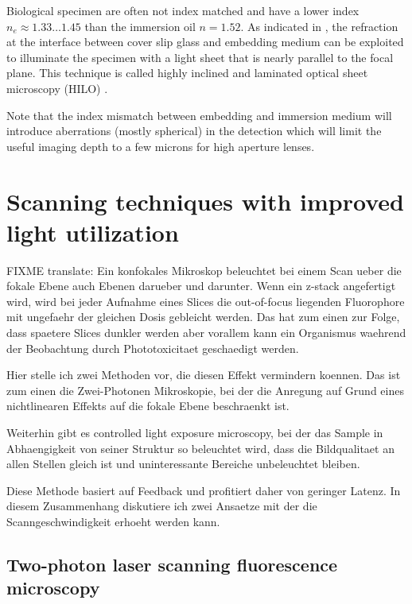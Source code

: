 
Biological specimen are often not index matched and have a lower index
$n_e\approx 1.33\ldots1.45$ than the immersion oil $n=1.52$. As
indicated in , the refraction at the interface
between cover slip glass and embedding medium can be exploited to
illuminate the specimen with a light sheet that is nearly parallel to
the focal plane.  This technique is called highly inclined and
laminated optical sheet microscopy (HILO) \citep{Tokunaga2008,
  Konopka2008}.


Note that the index mismatch between embedding and immersion medium
will introduce aberrations (mostly spherical) in the detection which
will limit the useful imaging depth to a few microns for high aperture
lenses.
\section{Scanning techniques with improved light utilization}
\begin{summary}
  FIXME translate: Ein konfokales Mikroskop beleuchtet bei einem Scan
  ueber die fokale Ebene auch Ebenen darueber und darunter. Wenn ein
  z-stack angefertigt wird, wird bei jeder Aufnahme eines Slices die
  out-of-focus liegenden Fluorophore mit ungefaehr der gleichen Dosis
  gebleicht werden. Das hat zum einen zur Folge, dass spaetere Slices
  dunkler werden aber vorallem kann ein Organismus waehrend der
  Beobachtung durch Phototoxicitaet geschaedigt werden.

  Hier stelle ich zwei Methoden vor, die diesen Effekt vermindern
  koennen. Das ist zum einen die Zwei-Photonen Mikroskopie, bei der
  die Anregung auf Grund eines nichtlinearen Effekts auf die fokale
  Ebene beschraenkt ist.

  Weiterhin gibt es controlled light exposure microscopy, bei der das
  Sample in Abhaengigkeit von seiner Struktur so beleuchtet wird, dass
  die Bildqualitaet an allen Stellen gleich ist und uninteressante
  Bereiche unbeleuchtet bleiben.

  Diese Methode basiert auf Feedback und profitiert daher von geringer
  Latenz. In diesem Zusammenhang diskutiere ich zwei Ansaetze mit der
  die Scanngeschwindigkeit erhoeht werden kann.
\end{summary}
\subsection{Two-photon laser scanning fluorescence microscopy}
\label{sec:2-photon}

